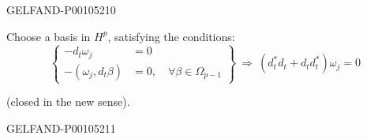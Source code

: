 \begin{GelfandAdjacentEvidence}{GELFAND-P001052}{10}


Choose a basis in $H^p$, satisfying the conditions:
\begin{equation*}
\left\{
\begin{aligned}
-d_t\omega_j&=0\\
-(\omega_j,d_t\beta)&=0,\quad\forall\beta\in\Omega_{p-1}
\end{aligned}
\right\}
\ \Rightarrow\
(d_t^*d_t+d_t d_t^*)\omega_j=0
\tag{1}
\end{equation*}
\begin{flushright}(closed in the new sense).\end{flushright}
\end{GelfandAdjacentEvidence}
\begin{GelfandAdjacentEvidence}{GELFAND-P001052}{11}

\end{GelfandAdjacentEvidence}



